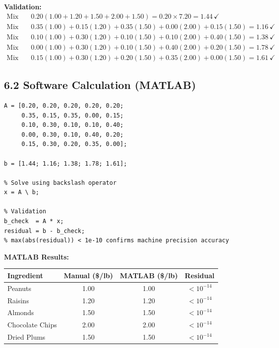 \documentclass[12pt,a4paper]{article}
\begin{document}
\textbf{Validation:}
\begin{align*}
\text{Mix A:} & \quad 0.20(1.00+1.20+1.50+2.00+1.50) = 0.20\times7.20 = 1.44\,\checkmark \\
\text{Mix B:} & \quad 0.35(1.00)+0.15(1.20)+0.35(1.50)+0.00(2.00)+0.15(1.50)=1.16\,\checkmark \\
\text{Mix C:} & \quad 0.10(1.00)+0.30(1.20)+0.10(1.50)+0.10(2.00)+0.40(1.50)=1.38\,\checkmark \\
\text{Mix D:} & \quad 0.00(1.00)+0.30(1.20)+0.10(1.50)+0.40(2.00)+0.20(1.50)=1.78\,\checkmark \\
\text{Mix E:} & \quad 0.15(1.00)+0.30(1.20)+0.20(1.50)+0.35(2.00)+0.00(1.50)=1.61\,\checkmark
\end{align*}

\subsection{6.2 Software Calculation (MATLAB)}

\begin{lstlisting}[style=matlabstyle, caption={Q6 -- Trail-mix ingredient costs in MATLAB}]
A = [0.20, 0.20, 0.20, 0.20, 0.20;
     0.35, 0.15, 0.35, 0.00, 0.15;
     0.10, 0.30, 0.10, 0.10, 0.40;
     0.00, 0.30, 0.10, 0.40, 0.20;
     0.15, 0.30, 0.20, 0.35, 0.00];

b = [1.44; 1.16; 1.38; 1.78; 1.61];

% Solve using backslash operator
x = A \ b;

% Validation
b_check  = A * x;
residual = b - b_check;
% max(abs(residual)) < 1e-10 confirms machine precision accuracy
\end{lstlisting}

\textbf{MATLAB Results:}

\begin{center}
\begin{tabular}{lccc}
  \toprule
  \textbf{Ingredient} & \textbf{Manual (\$/lb)} & \textbf{MATLAB (\$/lb)} & \textbf{Residual} \\
  \midrule
  Peanuts         & 1.00 & 1.00 & $< 10^{-14}$ \\
  Raisins         & 1.20 & 1.20 & $< 10^{-14}$ \\
  Almonds         & 1.50 & 1.50 & $< 10^{-14}$ \\
  Chocolate Chips & 2.00 & 2.00 & $< 10^{-14}$ \\
  Dried Plums     & 1.50 & 1.50 & $< 10^{-14}$ \\
  \bottomrule
\end{tabular}
\end{center}
\end{document}
